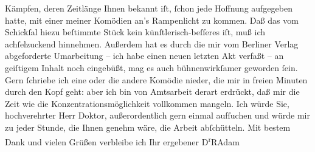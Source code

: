 \begin{ledgroupsized}[t]{13cm}
               Kämpfen, deren Zeitlänge Ihnen bekannt iſt, ſchon jede Hoffnung aufgegeben hatte, mit
               einer meiner Komödien an’s Rampenlicht zu kommen. Daß das vom Schickſal hiezu
               beſtimmte Stück kein
               künſtlerisch-beſſeres iſt, muß ich achſelzuckend hinnehmen. Außerdem hat es durch die
               mir vom Berliner Verlag abgeforderte Umarbeitung – ich habe einen neuen
               letzten Akt verfaßt – an geiſtigem Inhalt noch eingebüßt, mag es auch bühnenwirkſamer
               geworden ſein.\pend
           \pstart
           Gern ſchriebe ich eine oder die andere Komödie {\pb}nieder, die mir in freien Minuten durch
               den Kopf geht: aber ich bin von Amtsarbeit derart erdrückt, daß mir die Zeit wie die
               Konzentrationsmöglichkeit vollkommen mangeln.\pend
           \pstart
           Ich würde Sie, hochverehrter Herr Doktor, außerordentlich gern einmal aufſuchen und
               würde mir zu jeder Stunde, die Ihnen genehm wäre, die Arbeit abſchütteln.\pend
           \pstart
           Mit bestem Dank und vielen Grüßen verbleibe ich Ihr ergebener\pend
           \pstart \spacefill\mbox{D\textsuperscript{r}RAdam}\pend{}
         
         \endnumbering{}\end{ledgroupsized}  \newcommand{\dateiname}{L02538}\newcommand{\titel}{Robert Adam an Arthur Schnitzler, 15. 6. 1930}\newcommand{\editorInnen}{Martin Anton Müller und Gerd-Hermann Susen}
      